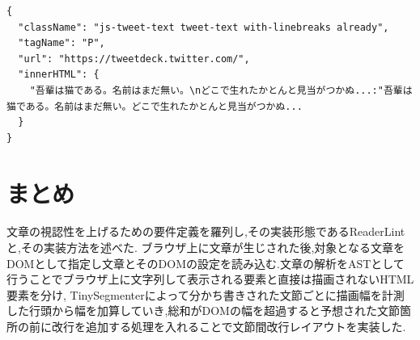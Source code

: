 \newpage

\begin{lstlisting}
{
  "className": "js-tweet-text tweet-text with-linebreaks already",
  "tagName": "P",
  "url": "https://tweetdeck.twitter.com/",
  "innerHTML": {
    "吾輩は猫である。名前はまだ無い。\nどこで生れたかとんと見当がつかぬ...:"吾輩は猫である。名前はまだ無い。どこで生れたかとんと見当がつかぬ...
  }
}
\end{lstlisting}

\section{まとめ}
文章の視認性を上げるための要件定義を羅列し,その実装形態であるReaderLintと,その実装方法を述べた.
ブラウザ上に文章が生じされた後,対象となる文章をDOMとして指定し文章とそのDOMの設定を読み込む.文章の解析をASTとして行うことでブラウザ上に文字列して表示される要素と直接は描画されないHTML要素を分け,
TinySegmenterによって分かち書きされた文節ごとに描画幅を計測した行頭から幅を加算していき,総和がDOMの幅を超過すると予想された文節箇所の前に改行を追加する処理を入れることで文節間改行レイアウトを実装した.
